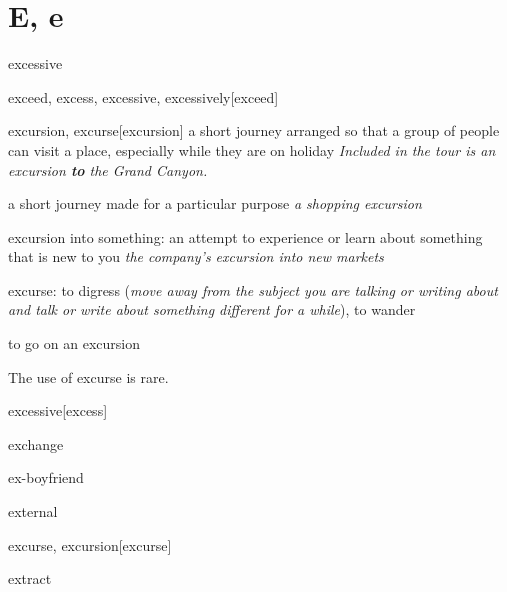 \section{E, e}

\begin{word}{excessive}
\end{word}

\begin{word}{exceed, excess, excessive, excessively}[exceed]
\end{word}

\begin{word}{excursion, excurse}[excursion]
    a short journey arranged so that a group of people can visit a place, especially while they are on holiday
    \textit{Included in the tour is an excursion \textbf{to} the Grand Canyon.}

    a short journey made for a particular purpose
    \textit{a shopping excursion}

    excursion into something: an attempt to experience or learn about something that is new to you
    \textit{the company's excursion into new markets}

    excurse: to digress (\textit{move away from the subject you are talking or writing about and talk or write about something different for a while}), to wander

    to go on an excursion
\end{word}

\begin{remark}
    The use of excurse is rare.
\end{remark}

\begin{word}{excessive}[excess]
\end{word}

\begin{word}{exchange}
\end{word}

\begin{word}{ex-boyfriend}
\end{word}

\begin{word}{external}
\end{word}

\begin{word}{excurse, excursion}[excurse]
\end{word}

\begin{word}{extract}
\end{word}

